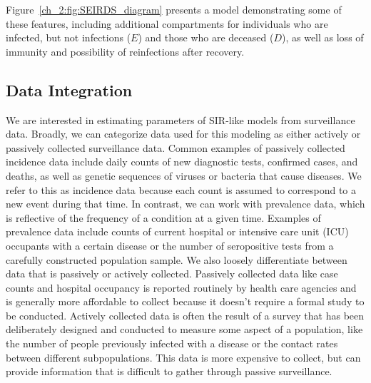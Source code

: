 Figure~\ref{ch_2:fig:SEIRDS_diagram} presents a model demonstrating some of these features, including additional compartments for individuals who are infected, but not infections (\( E \)) and those who are deceased (\( D \)), as well as loss of immunity and possibility of reinfections after recovery.

\subsection{Data Integration}
\label{ch_2:sec:data_integration}
We are interested in estimating parameters of SIR-like models from surveillance data.
Broadly, we can categorize data used for this modeling as either actively or passively collected surveillance data.
Common examples of passively collected incidence data include daily counts of new diagnostic tests, confirmed cases, and deaths, as well as genetic sequences of viruses or bacteria that cause diseases.
We refer to this as incidence data because each count is assumed to correspond to a new event during that time.
In contrast, we can work with prevalence data, which is reflective of the frequency of a condition at a given time.
Examples of prevalence data include counts of current hospital or intensive care unit (ICU) occupants with a certain disease or the number of seropositive tests from a carefully constructed population sample.
We also loosely differentiate between data that is passively or actively collected.
Passively collected data like case counts and hospital occupancy is reported routinely by health care agencies and is generally more affordable to collect because it doesn't require a formal study to be conducted.
Actively collected data is often the result of a survey that has been deliberately designed and conducted to measure some aspect of a population, like the number of people previously infected with a disease or the contact rates between different subpopulations.
This data is more expensive to collect, but can provide information that is difficult to gather through passive surveillance.

